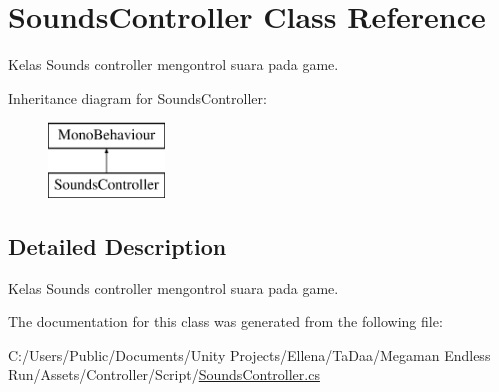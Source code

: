 \hypertarget{class_sounds_controller}{}\section{Sounds\+Controller Class Reference}
\label{class_sounds_controller}


Kelas Sounds controller mengontrol suara pada game.  


Inheritance diagram for Sounds\+Controller\+:\begin{figure}[H]
\begin{center}
\leavevmode
\includegraphics[height=2.000000cm]{class_sounds_controller}
\end{center}
\end{figure}


\subsection{Detailed Description}
Kelas Sounds controller mengontrol suara pada game. 



The documentation for this class was generated from the following file\+:\begin{DoxyCompactItemize}
\item 
C\+:/\+Users/\+Public/\+Documents/\+Unity Projects/\+Ellena/\+Ta\+Daa/\+Megaman Endless Run/\+Assets/\+Controller/\+Script/\hyperlink{_sounds_controller_8cs}{Sounds\+Controller.\+cs}\end{DoxyCompactItemize}

